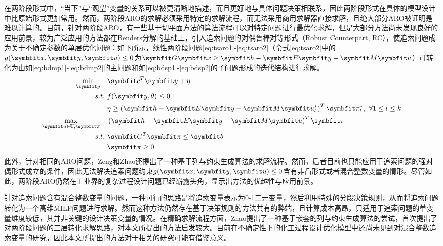 在两阶段形式中，“当下”与“观望”变量的关系可以被更清晰地描述，而且更好地与具体问题决策相联系，因此两阶段形式在具体的模型设计中比原始形式更加常用。然而，两阶段ARO的求解必须采用特定的求解流程，而无法采用商用求解器直接求解，且绝大部分ARO被证明是难以计算的\cite{bental2004}。目前，针对两阶段ARO，有一些基于切平面方法的算法流程可以对特定问题进行最优化求解\cite{takeda2008}，但是大部分方法尚未发现良好的应用前景，较为广泛应用的方法都在Benders分解\cite{geoffrion1972}的基础上，引入追索问题的对偶鲁棒对等形式（Robust Counterpart, RC），使追索问题成为关于不确定参数的单层优化问题：如下所示，线性两阶段问题\eqref{eq:tsaro1}-\eqref{eq:tsaro2}（令式\eqref{eq:tsaro2}中的$g(\symbfit x, \symbfit y, \symbfit u) \le 0$为$\symbfit G \symbfit x \ge \symbfit h - \symbfit E \symbfit y - \symbfit M \symbfit u$）可转化为由如\eqref{eq:bdmp1}-\eqref{eq:bdmp2}的主问题和如\eqref{eq:bdsp1}-\eqref{eq:bdsp2}的子问题形成的迭代结构进行求解\cite{zeng2013}。
\begin{align}
  \min_{\symbfit y}\quad &\symbfit c^T\symbfit y + \eta \label{eq:bdmp1}\\
   s.t.\ & f(\symbfit y,\theta) \le 0 \\
   & \eta \ge \left(\symbfit h - \symbfit E \symbfit y - \symbfit M \symbfit u^*_l\right)^T\symbfit \pi^*_l,\ \forall 1\le l\le k \label{eq:bdmp2} \\
  \max_{\symbfit u\in\mathbb U, \symbfit \pi}\quad &\left(\symbfit h - \symbfit E \symbfit y - \symbfit M \symbfit u\right)^T\symbfit \pi \label{eq:bdsp1}\\
   s.t.\ & \symbfit G^T\symbfit \pi \le \symbfit b \\
   & \symbfit \pi \ge 0 \label{eq:bdsp2}
\end{align}
此外，针对相同的ARO问题，Zeng和Zhao还提出了一种基于列与约束生成算法的求解流程\cite{zeng2013}。然而，后者目前也只能应用于追索问题的强对偶形式成立的条件，因此无法解决追索问题约束$g(\symbfit x, \symbfit y, \symbfit u) \le 0$含有非凸形式或者混合整数变量的情形。尽管如此，两阶段ARO仍然在工业界的复杂过程设计问题已经崭露头角，显示出方法的优越性与应用前景\cite{gong2017}。

针对追索问题含有混合整数变量的问题，一种可行的思路是将追索变量表示为0-1二元变量，然后利用特殊的分段决策规则，从而将追索问题转化为一个高维MILP问题进行求解\cite{zhang2016}。然而这种方法仍然存在基于决策规则的方法共有的弊端，且计算成本高昂，只适用于追索问题的单变量维度较低，其并非关键的设计决策变量的情况。在精确求解流程方面，Zhao提出了一种基于嵌套的列与约束生成算法的尝试\cite{zhao2012}，首次提出了对两阶段问题的三层转化求解思路，对本文所提出的方法启发较大。目前在不确定性下的化工过程设计优化模型中还尚未见到对混合整数追索变量的研究，因此本文所提出的方法对于相关的研究可能有借鉴意义。

